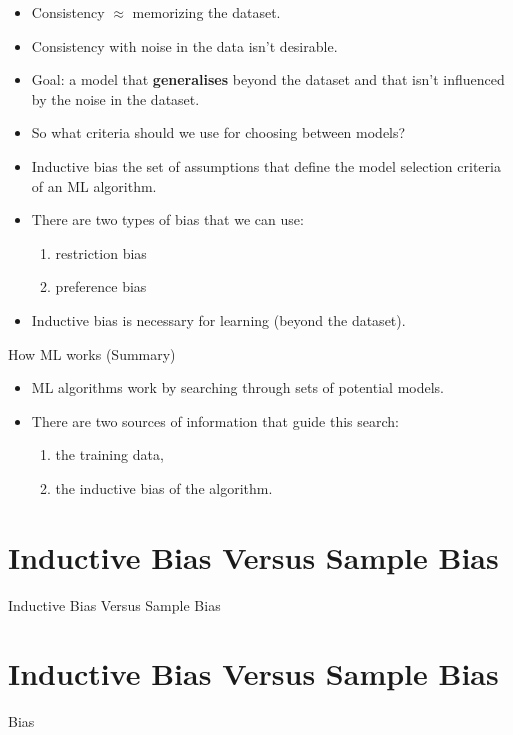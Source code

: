 \documentclass[xcolor={table}]{beamer}
\newcommand{\SectionSlideShortHeader}[3][]{
	\ifthenelse{\isempty{#1}}
		{\section[#3]{#2}\begin{frame} \begin{center}\begin{huge}#2\end{huge}\end{center}\end{frame}}
		{\section[#1]{#2}\begin{frame} \begin{center}\begin{huge}#3\end{huge}\end{center}\end{frame}}
}
\newcommand{\keyword}[1]{\alert{\textbf{#1}}\index{#1}}
\begin{document}
\begin{frame}
	\begin{itemize}
		\item Consistency $\approx$ \alert{memorizing} the dataset. 
		\item Consistency with  \alert{noise} in the data isn't desirable.
		\item Goal: a model that \keyword{generalises} beyond the dataset and that isn't influenced by the noise in the dataset.
		\item So what criteria should we use for choosing between models?
	\end{itemize}
\end{frame}

\begin{frame}
		\begin{itemize}
			\item \alert{Inductive bias} the set of assumptions that define the model selection criteria of an ML algorithm.
			\item There are two types of bias that we can use:
			\begin{enumerate}
					\item restriction bias
					\item preference bias
			\end{enumerate}
			\item Inductive bias is necessary for learning (beyond the dataset).
		\end{itemize}
\end{frame}

\begin{frame}
	\begin{block}{How ML works (Summary)}
	\begin{itemize}
		\item ML algorithms work by searching through sets of potential models.
		\item There are two sources of information that guide this search:
			\begin{enumerate}
				\item the training data,
				\item the inductive bias of the algorithm.
			\end{enumerate}
	\end{itemize}
	\end{block}
\end{frame}

\SectionSlideShortHeader{Inductive Bias Versus Sample Bias}{Bias}
\end{document}

